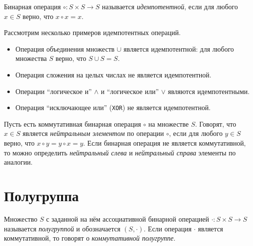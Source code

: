 \begin{definition}
Бинарная операция $\circ : S \times S \to S$ называется \emph{идемпотентной}, если для любого  $x \in S$ верно, что  $x \circ x = x$.
\end{definition}



\begin{example} Рассмотрим несколько примеров идемпотентных операций.

\begin{itemize}
	\item Операция объединения множеств $\cup$ является идемпотентной: для любого множества $S$ верно, что $S \cup S = S$.
	\item Операция сложения на целых числах не является идемпотентной.
	\item Операции ``логическое и'' $\wedge$ и ``логическое или'' $\vee$ являются идемпотентными.
	\item Операция ``исключающее или'' (\texttt{XOR}) не является идемпотентной.
\end{itemize}

\end{example}

\begin{definition}
Пусть есть коммутативная бинарная операция $\circ$ на множестве $S$. Говорят, что $x\in S$ является \emph{нейтральным элементом} по операции $\circ$, если для любого $y\in S$ верно, что $x \circ y = y \circ x = y$. Если бинарная операция не является коммутативной, то можно определить \textit{нейтральный слева} и \textit{нейтральный справа} элементы по аналогии.
\end{definition}


\section{Полугруппа}


\begin{definition}
Множество $S$ с заданной на нём ассоциативной бинарной операцией $\cdot : S \times S \to S$ называется \emph{полугруппой} и обозначается $(S, \cdot)$.
Если операция $\cdot$ является коммутативной, то говорят о \textit{коммутативной полугруппе}.
\end{definition}


